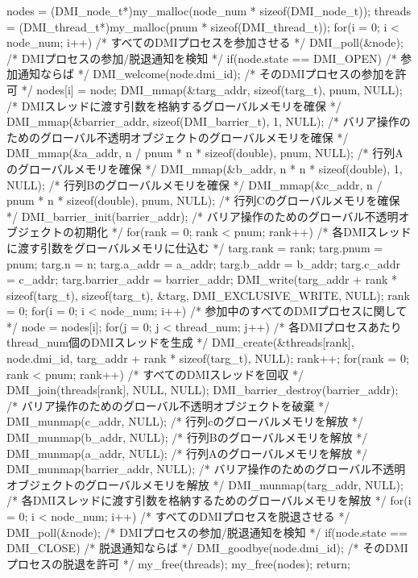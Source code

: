 \documentclass[report,12pt]{jsbook}
\begin{document}
\begin{code}
{  nodes = (DMI_node_t*)my_malloc(node_num * sizeof(DMI_node_t));
  threads = (DMI_thread_t*)my_malloc(pnum * sizeof(DMI_thread_t));
  for(i = 0; i < node_num; i++)  /* すべてのDMIプロセスを参加させる */
    {
      DMI_poll(&node);  /* DMIプロセスの参加/脱退通知を検知 */
      if(node.state == DMI_OPEN)  /* 参加通知ならば */
        {
          DMI_welcome(node.dmi_id);  /* そのDMIプロセスの参加を許可 */
          nodes[i] = node;
        }
    }
  DMI_mmap(&targ_addr, sizeof(targ_t), pnum, NULL);  /* DMIスレッドに渡す引数を格納するグローバルメモリを確保 */
  DMI_mmap(&barrier_addr, sizeof(DMI_barrier_t), 1, NULL);  /* バリア操作のためのグローバル不透明オブジェクトのグローバルメモリを確保 */
  DMI_mmap(&a_addr, n / pnum * n * sizeof(double), pnum, NULL);  /* 行列Aのグローバルメモリを確保 */
  DMI_mmap(&b_addr, n * n * sizeof(double), 1, NULL);  /* 行列Bのグローバルメモリを確保 */
  DMI_mmap(&c_addr, n / pnum * n * sizeof(double), pnum, NULL);  /* 行列Cのグローバルメモリを確保 */
  DMI_barrier_init(barrier_addr);  /* バリア操作のためのグローバル不透明オブジェクトの初期化 */
  for(rank = 0; rank < pnum; rank++)  /* 各DMIスレッドに渡す引数をグローバルメモリに仕込む */
    {
      targ.rank = rank;
      targ.pnum = pnum;
      targ.n = n;
      targ.a_addr = a_addr;
      targ.b_addr = b_addr;
      targ.c_addr = c_addr;
      targ.barrier_addr = barrier_addr;
      DMI_write(targ_addr + rank * sizeof(targ_t), sizeof(targ_t), &targ, DMI_EXCLUSIVE_WRITE, NULL);
    }
  rank = 0;
  for(i = 0; i < node_num; i++)  /* 参加中のすべてのDMIプロセスに関して */
    {
      node = nodes[i];
      for(j = 0; j < thread_num; j++)  /* 各DMIプロセスあたりthread_num個のDMIスレッドを生成 */
        {
          DMI_create(&threads[rank], node.dmi_id, targ_addr + rank * sizeof(targ_t), NULL);
          rank++;
        }
    }
  for(rank = 0; rank < pnum; rank++)  /* すべてのDMIスレッドを回収 */
    {
      DMI_join(threads[rank], NULL, NULL);
    }
  DMI_barrier_destroy(barrier_addr);  /* バリア操作のためのグローバル不透明オブジェクトを破棄 */
  DMI_munmap(c_addr, NULL);  /* 行列cのグローバルメモリを解放 */
  DMI_munmap(b_addr, NULL);  /* 行列Bのグローバルメモリを解放 */
  DMI_munmap(a_addr, NULL);  /* 行列Aのグローバルメモリを解放 */
  DMI_munmap(barrier_addr, NULL);  /* バリア操作のためのグローバル不透明オブジェクトのグローバルメモリを解放 */
  DMI_munmap(targ_addr, NULL);  /* 各DMIスレッドに渡す引数を格納するためのグローバルメモリを解放 */
  for(i = 0; i < node_num; i++)  /* すべてのDMIプロセスを脱退させる */
    {
      DMI_poll(&node);  /* DMIプロセスの参加/脱退通知を検知 */
      if(node.state == DMI_CLOSE)  /* 脱退通知ならば */
        {
          DMI_goodbye(node.dmi_id);  /* そのDMIプロセスの脱退を許可 */
        }
    }
  my_free(threads);
  my_free(nodes);
  return;
}


\end{code}
\end{document}
